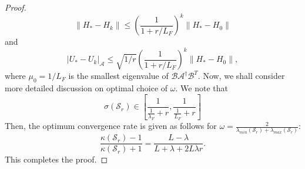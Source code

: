 \begin{itemize}
\begin{proof}
\begin{equation}
\|H_* - H_k\| \leq \left ( \frac{1}{1 + r/L_F}\right )^k \|H_* - H_0\| 
\end{equation} 
and 
\begin{equation}
|U_* - U_k|_{\mathcal{A}} \leq \sqrt{1/r} \left ( \frac{1}{1 + r/ L_F}\right )^k \|H_* - H_0\|,  
\end{equation} 
where $\mu_0 = 1/L_F$ is the smallest eigenvalue of $\mathcal{B} \mathcal{A}^{\dag} \mathcal{B}^T$. Now, we shall consider more detailed discussion on optimal choice of $\omega$. We note that 
\begin{equation}
\sigma(\mathcal{S}_r) \in \left [ \frac{1}{\frac{1}{\lambda_F} + r},\frac{1}{\frac{1}{L_F} + r}\right ]
\end{equation} 
Then, the optimum convergence rate is given as follows for $\omega = \frac{2}{\lambda_{min}(\mathcal{S}_r) + \lambda_{max}(\mathcal{S}_r)}$: 
\begin{equation}
\frac{\kappa(\mathcal{S}_r) - 1}{\kappa(\mathcal{S}_r) + 1} = \frac{L - \lambda}{L + \lambda + 2 L \lambda r}.
\end{equation} 
This completes the proof. 
\end{proof} 


\end{itemize}

